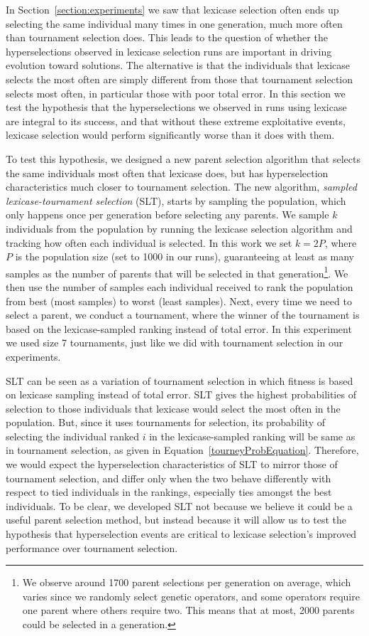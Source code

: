 \documentclass{sig-alternate}
\newcommand{\definition}[1]{\textit{#1}}
\begin{document}
In Section~\ref{section:experiments} we saw that lexicase selection often ends up selecting the same individual many times in one generation, much more often than tournament selection does. This leads to the question of whether the hyperselections observed in lexicase selection runs are important in driving evolution toward solutions. %
The alternative is that the individuals that lexicase selects the most often are simply different from those that tournament selection selects most often, in particular those with poor total error. In this section we test the hypothesis that the hyperselections we observed in runs using lexicase are integral to its success, and that without these extreme exploitative events, lexicase selection would perform significantly worse than it does with them.

To test this hypothesis, we designed a new parent selection algorithm that selects the same individuals most often that lexicase does, but has hyperselection characteristics much closer to tournament selection. The new algorithm, \definition{sampled lexicase-tournament selection} (SLT), starts by sampling the population, which only happens once per generation before selecting any parents. We sample $k$ individuals from the population by running the lexicase selection algorithm and tracking how often each individual is selected. In this work we set $k = 2P$, where $P$ is the population size (set to 1000 in our runs), guaranteeing at least as many samples as the number of parents that will be selected in that generation\footnote{We observe around 1700 parent selections per generation on average, which varies since we randomly select genetic operators, and some operators require one parent where others require two. This means that at most, 2000 parents could be selected in a generation.}. We then use the number of samples each individual received to rank the population from best (most samples) to worst (least samples). Next, every time we need to select a parent, we conduct a tournament, where the winner of the tournament is based on the lexicase-sampled ranking instead of total error. In this experiment we used size 7 tournaments, just like we did with tournament selection in our experiments.

SLT can be seen as a variation of tournament selection in which fitness is based on lexicase sampling instead of total error.
SLT gives the highest probabilities of selection to those individuals that lexicase would select the most often in the population. But, since it uses tournaments for selection, its probability of selecting the individual ranked $i$ in the lexicase-sampled ranking will be same as in tournament selection, as given in Equation~\ref{tourneyProbEquation}. Therefore, we would expect the hyperselection characteristics of SLT to mirror those of tournament selection, and differ only when the two behave differently with respect to tied individuals in the rankings, especially ties amongst the best individuals. To be clear, we developed SLT not because we believe it could be a useful parent selection method, but instead because it will allow us to test the hypothesis that hyperselection events are critical to lexicase selection's improved performance over tournament selection.
\end{document}
